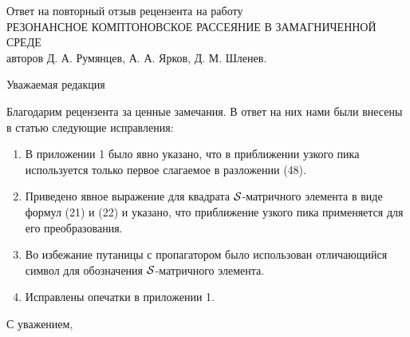 \documentclass[14pt, russian]{article}
\begin{document}
\begin{center}
Ответ на повторный отзыв рецензента на работу\\
РЕЗОНАНСНОЕ КОМПТОНОВСКОЕ РАССЕЯНИЕ В ЗАМАГНИЧЕННОЙ СРЕДЕ\\
авторов Д. А. Румянцев, А. А. Ярков, Д. М. Шленев.

\vspace{5mm}
Уважаемая редакция
\end{center}

Благодарим рецензента за ценные замечания. В ответ на них нами были внесены в 
статью следующие исправления:
\begin{enumerate}
	\item В приложении 1 было явно указано, что в приближении узкого пика 
	используется только первое слагаемое в разложении (48).
	\item Приведено явное выражение для квадрата ${\cal S}$-матричного элемента в виде формул (21) и 
(22) и указано, что приближение узкого пика применяется для его преобразования.
	\item Во избежание путаницы с пропагатором было использован отличающийся символ для обозначения 
${\cal S}$-матричного элемента.
	\item Исправлены опечатки в приложении 1.
\end{enumerate}

\vspace{5mm}
С уважением,
\end{document}
